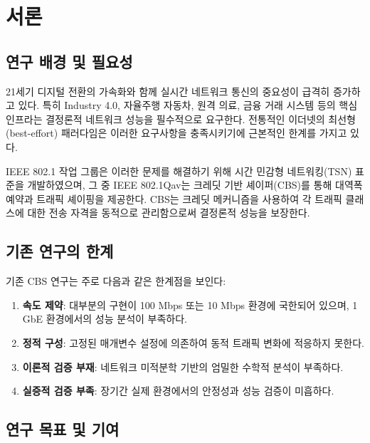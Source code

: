 \documentclass[12pt, a4paper]{article}
\begin{document}
\newpage

\section{서론}

\subsection{연구 배경 및 필요성}

21세기 디지털 전환의 가속화와 함께 실시간 네트워크 통신의 중요성이 급격히 증가하고 있다. 특히 Industry 4.0, 자율주행 자동차, 원격 의료, 금융 거래 시스템 등의 핵심 인프라는 결정론적 네트워크 성능을 필수적으로 요구한다. 전통적인 이더넷의 최선형(best-effort) 패러다임은 이러한 요구사항을 충족시키기에 근본적인 한계를 가지고 있다.

IEEE 802.1 작업 그룹은 이러한 문제를 해결하기 위해 시간 민감형 네트워킹(TSN) 표준을 개발하였으며, 그 중 IEEE 802.1Qav는 크레딧 기반 셰이퍼(CBS)를 통해 대역폭 예약과 트래픽 셰이핑을 제공한다. CBS는 크레딧 메커니즘을 사용하여 각 트래픽 클래스에 대한 전송 자격을 동적으로 관리함으로써 결정론적 성능을 보장한다.

\subsection{기존 연구의 한계}

기존 CBS 연구는 주로 다음과 같은 한계점을 보인다:

\begin{enumerate}
    \item \textbf{속도 제약}: 대부분의 구현이 100 Mbps 또는 10 Mbps 환경에 국한되어 있으며, 1 GbE 환경에서의 성능 분석이 부족하다.
    
    \item \textbf{정적 구성}: 고정된 매개변수 설정에 의존하여 동적 트래픽 변화에 적응하지 못한다.
    
    \item \textbf{이론적 검증 부재}: 네트워크 미적분학 기반의 엄밀한 수학적 분석이 부족하다.
    
    \item \textbf{실증적 검증 부족}: 장기간 실제 환경에서의 안정성과 성능 검증이 미흡하다.
\end{enumerate}

\subsection{연구 목표 및 기여}
\end{document}
